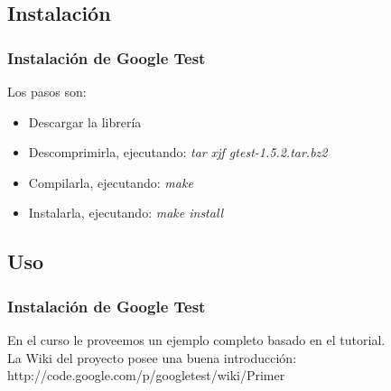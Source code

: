 \documentclass{beamer}
\begin{document}
\subsection{Instalación}
\begin{frame}
\frametitle{Instalación de Google Test}
Los pasos son:
\begin{itemize}
 \item Descargar la librería
 \item Descomprimirla, ejecutando: \emph{tar xjf gtest-1.5.2.tar.bz2}
 \item Compilarla, ejecutando: \emph{make}
 \item Instalarla, ejecutando: \emph{make install}
\end{itemize}

\end{frame}

\subsection{Uso}
\begin{frame}
\frametitle{Instalación de Google Test}
En el curso le proveemos un ejemplo completo basado en el tutorial. \\
La Wiki del proyecto posee una buena introducción:
  http://code.google.com/p/googletest/wiki/Primer
\end{frame}
\end{document}

